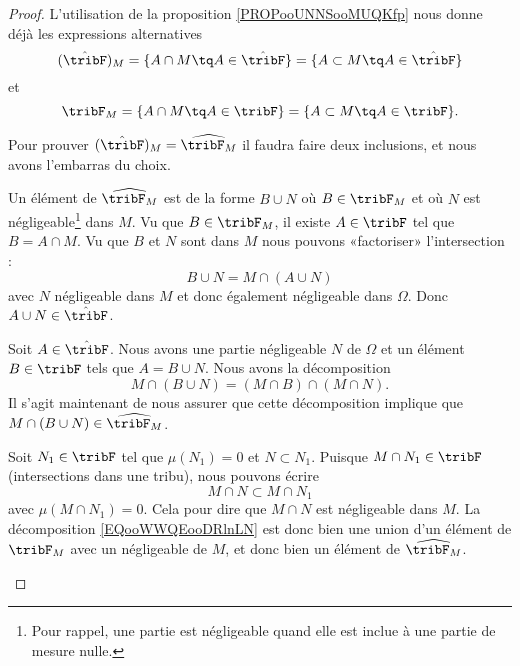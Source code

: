 \begin{proof}
	L'utilisation de la proposition \ref{PROPooUNNSooMUQKfp} nous donne déjà les expressions alternatives
	\begin{equation}
		(\hat\tribF)_M=\{ A\cap M\tq A\in\hat\tribF \}=\{ A\subset M\tq A\in\hat\tribF \}
	\end{equation}
	et
	\begin{equation}
		\tribF_M=\{ A\cap M\tq A\in\tribF \}=\{ A\subset M\tq A\in\tribF \}.
	\end{equation}

	Pour prouver \( (\hat\tribF)_M=\widehat{\tribF_M}\) il faudra faire deux inclusions, et nous avons l'embarras du choix.
	\begin{subproof}
		Un élément de \( \widehat{\tribF_M}\) est de la forme \( B\cup N\) où \( B\in \tribF_M\) et où \( N\) est négligeable\footnote{Pour rappel, une partie est négligeable quand elle est inclue à une partie de mesure nulle.} dans \( M\). Vu que \( B\in\tribF_M\), il existe \( A\in\tribF\) tel que \( B=A\cap M\). Vu que \( B\) et \( N\) sont dans \( M\) nous pouvons «factoriser» l'intersection :
		\begin{equation}
			B\cup N=M\cap (A\cup N)
		\end{equation}
		avec \( N\) négligeable dans \( M\) et donc également négligeable dans \( \Omega\). Donc \( A\cup N\in \hat\tribF\).


		Soit \( A\in\hat\tribF\). Nous avons une partie négligeable \( N\) de \( \Omega\) et un élément \( B\in \tribF\) tels que \( A=B\cup N\). Nous avons la décomposition
		\begin{equation}        \label{EQooWWQEooDRlnLN}
			M\cap(B\cup N)=(M\cap B)\cap(M\cap N).
		\end{equation}
		Il s'agit maintenant de nous assurer que cette décomposition implique que \( M\cap(B\cup N)\in \widehat{\tribF_M}\).

		Soit \( N_1\in \tribF\) tel que \( \mu(N_1)=0\) et \( N\subset N_1\). Puisque \( M\cap N_1\in \tribF\) (intersections dans une tribu), nous pouvons écrire
		\begin{equation}
			M\cap N\subset M\cap N_1
		\end{equation}
		avec \( \mu(M\cap N_1)=0\). Cela pour dire que \( M\cap N\) est négligeable dans \( M\). La décomposition \eqref{EQooWWQEooDRlnLN} est donc bien une union d'un élément de \( \tribF_M\) avec un négligeable de \( M\), et donc bien un élément de \( \widehat{\tribF_M}\).
	\end{subproof}
\end{proof}

